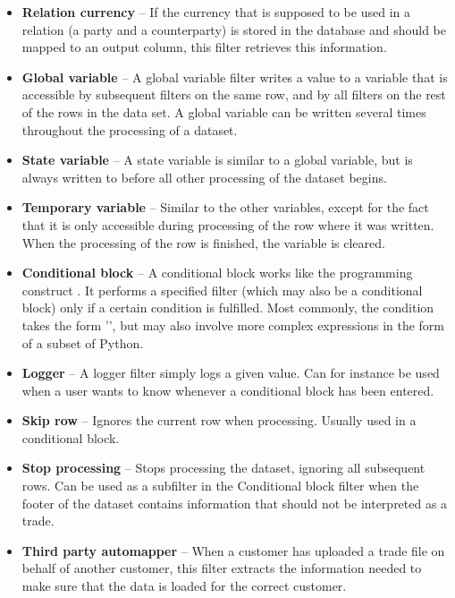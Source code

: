 \begin{itemize}
\item \textbf{Relation currency} --
If the currency that is supposed to be used in a relation (a party and a counterparty) is stored in the database and should be mapped to an output column, this
filter retrieves this information.

\item \textbf{Global variable} --
A global variable filter writes a value to a variable that is accessible by subsequent filters on the same row, and by all filters on the rest of the rows in the data
set. A global variable can be written several times throughout the processing of a dataset.

\item \textbf{State variable} --
A state variable is similar to a global variable, but is always written to before all other processing of the dataset begins.

\item \textbf{Temporary variable} --
Similar to the other variables, except for the fact that it is only accessible during processing of the row where it was written. When the 
processing of the row is finished, the variable is cleared.

\item \textbf{Conditional block} --
A conditional block works like the programming construct . It performs a specified filter (which may also be a conditional block) only if a certain
condition is fulfilled. Most commonly, the condition takes the form '', but may also involve more complex expressions in the form of a
subset of Python.

\item \textbf{Logger} --
A logger filter simply logs a given value. Can for instance be used when a user wants to know whenever a conditional block has been entered.

\item \textbf{Skip row} --
Ignores the current row when processing. Usually used in a conditional block.

\item \textbf{Stop processing} --
Stops processing the dataset, ignoring all subsequent rows. Can be used as a subfilter in the Conditional block filter when the footer of the dataset
contains information that should not be interpreted as a trade.

\item \textbf{Third party automapper} --
When a customer has uploaded a trade file on behalf of another customer, this filter extracts the information needed to make sure that the data is loaded
for the correct customer.


\end{itemize}

